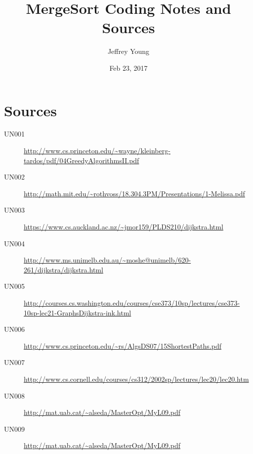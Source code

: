 \documentclass[10pt, letterpaper]{article}
\author{Jeffrey Young}
\date{Feb 23, 2017}
\title{MergeSort Coding Notes and Sources}
\begin{document}
\maketitle

\section*{Sources}
\label{sec:orge955821}
\begin{description}
\item[{UN001}] \url{http://www.cs.princeton.edu/\~wayne/kleinberg-tardos/pdf/04GreedyAlgorithmsII.pdf}
\item[{UN002}] \url{http://math.mit.edu/\~rothvoss/18.304.3PM/Presentations/1-Melissa.pdf}
\item[{UN003}] \url{https://www.cs.auckland.ac.nz/\~jmor159/PLDS210/dijkstra.html}
\item[{UN004}] \url{http://www.ms.unimelb.edu.au/\~moshe@unimelb/620-261/dijkstra/dijkstra.html}
\item[{UN005}] \url{http://courses.cs.washington.edu/courses/cse373/10sp/lectures/cse373-10sp-lec21-GraphsDijkstra-ink.html}
\item[{UN006}] \url{http://www.cs.princeton.edu/\~rs/AlgsDS07/15ShortestPaths.pdf}
\item[{UN007}] \url{http://www.cs.cornell.edu/courses/cs312/2002sp/lectures/lec20/lec20.htm}
\item[{UN008}] \url{http://mat.uab.cat/\~alseda/MasterOpt/MyL09.pdf}
\item[{UN009}] \url{http://mat.uab.cat/\~alseda/MasterOpt/MyL09.pdf}
\end{description}
\end{document}
